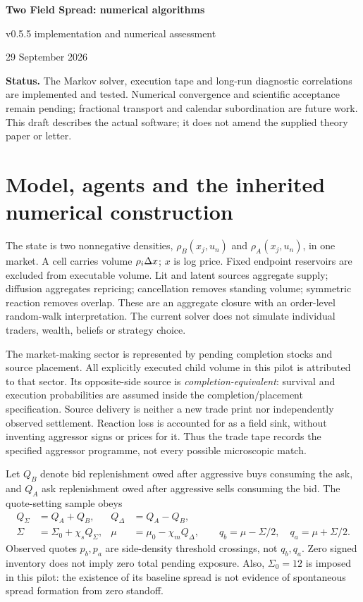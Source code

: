\documentclass[11pt,a4paper]{article}
\begin{document}
\begin{center}
{\Large\bfseries Two Field Spread: numerical algorithms}\par
{\large v0.5.5 implementation and numerical assessment}\par
29 September 2026
\end{center}
\textbf{Status.} The Markov solver, execution tape and long-run diagnostic correlations are
implemented and tested. Numerical convergence and scientific acceptance
remain pending; fractional transport and calendar subordination are future work. This draft describes the actual
software; it does not amend the supplied theory paper or letter.

\section{Model, agents and the inherited numerical construction}
The state is two nonnegative densities, $\rho_B(x_j,u_n)$ and
$\rho_A(x_j,u_n)$, in one market. A cell carries volume $\rho_i\Delta x$;
$x$ is log price. Fixed endpoint reservoirs are excluded from executable
volume. Lit and latent sources aggregate supply; diffusion aggregates
repricing; cancellation removes standing volume; symmetric reaction removes
overlap. These are an aggregate closure with an order-level random-walk
interpretation. The current solver does not simulate individual traders,
wealth, beliefs or strategy choice.

The market-making sector is represented by pending completion stocks and
source placement. All explicitly executed child volume in this pilot is
attributed to that sector. Its opposite-side source is
\emph{completion-equivalent}: survival and execution probabilities are
assumed inside the completion/placement specification. Source delivery is
neither a new trade print nor independently observed settlement. Reaction
loss is accounted for as a field sink, without inventing aggressor signs or
prices for it. Thus the trade tape records the specified aggressor programme,
not every possible microscopic match.

Let $Q_B$ denote bid replenishment owed after aggressive buys consuming the ask,
and $Q_A$ ask replenishment owed after aggressive sells consuming the bid. The quote-setting sample obeys
\begin{align}
 Q_\Sigma&=Q_A+Q_B,& Q_\Delta&=Q_A-Q_B,\\
 \Sigma&=\Sigma_0+\chi_s Q_\Sigma,&
 \mu&=\mu_0-\chi_m Q_\Delta,\qquad
 q_b=\mu-\Sigma/2,\quad q_a=\mu+\Sigma/2.
\end{align}
Observed quotes $p_b,p_a$ are side-density threshold crossings, not $q_b,q_a$.
Zero signed inventory does not imply zero total pending exposure. Also,
$\Sigma_0=12$ is imposed in this pilot: the existence of its baseline spread
is not evidence of spontaneous spread formation from zero standoff.
\end{document}
